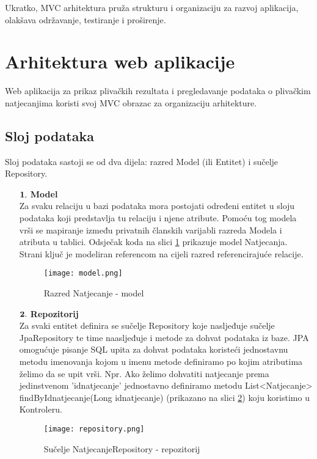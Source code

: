 \documentclass[times, utf8, zavrsni]{fer}
\begin{document}
\noindent Ukratko, MVC arhitektura pruža strukturu i organizaciju za razvoj aplikacija, olakšava održavanje, testiranje i proširenje.


\section{Arhitektura web aplikacije}

Web aplikacija za prikaz plivačkih rezultata i pregledavanje podataka o plivačkim natjecanjima koristi svoj MVC obrazac
za organizaciju arhitekture.

\subsection{Sloj podataka}
Sloj podataka sastoji se od dva dijela: razred Model (ili Entitet) i sučelje Repository.

\begin{enumerate}

    \item[$\textbf1.$] \textbf{Model} \\
    Za svaku relaciju u bazi podataka mora postojati određeni entitet u sloju podataka koji predstavlja tu relaciju i njene atribute.
    Pomoću tog modela vrši se mapiranje između privatnih članskih varijabli razreda Modela i atributa u tablici. Odsječak koda na slici
    \ref{fig:model} prikazuje model Natjecanja. Strani ključ je modeliran referencom na cijeli razred referencirajuće relacije. 

    \begin{figure}[!h]
        \centering
        \texttt{[image: model.png]}
        \centering
        \caption{Razred Natjecanje - model}
        \label{fig:model}
    \end{figure}

    \item[$\textbf2.$] \textbf{Repozitorij} \\
    Za svaki entitet definira se sučelje Repository koje nasljeđuje sučelje JpaRepository te time naasljeđuje i metode za dohvat
    podataka iz baze. JPA omogućuje pisanje SQL upita za dohvat podataka koristeći jednostavnu metodu imenovanja kojom u imenu metode
    definiramo po kojim atributima želimo da se upit vrši. Npr. Ako želimo dohvatiti natjecanje prema jedinstvenom 'idnatjecanje' 
    jednostavno definiramo metodu List<Natjecanje> findByIdnatjecanje(Long idnatjecanje) (prikazano na slici \ref{fig:repository}) koju koristimo u Kontroleru. 

    \begin{figure}[!h]
        \centering
        \texttt{[image: repository.png]}
        \centering
        \caption{Sučelje NatjecanjeRepository - repozitorij}
        \label{fig:repository}
    \end{figure}

\end{enumerate}
\end{document}
